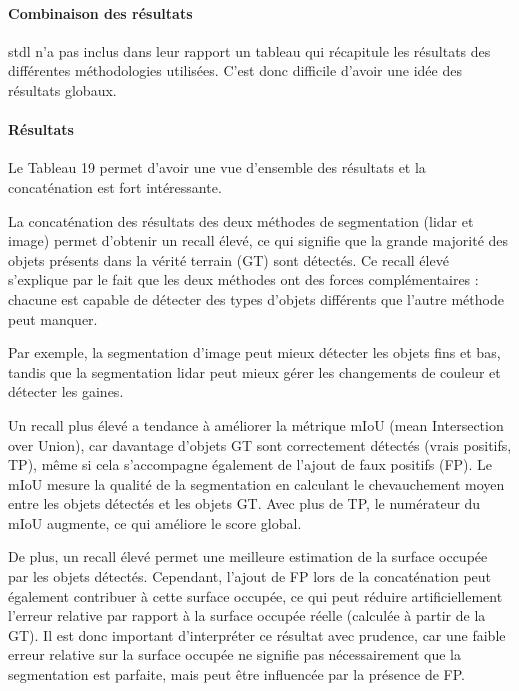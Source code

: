 {{{{\paragraph{Combinaison des résultats}

\acrshort{stdl} n'a pas inclus dans leur rapport un tableau qui récapitule les résultats des différentes méthodologies utilisées. C'est donc difficile d'avoir une idée des résultats globaux.

\paragraph{Résultats}

Le Tableau 19 permet d'avoir une vue d'ensemble des résultats et la concaténation est fort intéressante.

La concaténation des résultats des deux méthodes de segmentation (\gls{lidar} et image) permet d'obtenir un recall élevé, ce qui signifie que la grande majorité des objets présents dans la vérité terrain (GT) sont détectés. Ce recall élevé s'explique par le fait que les deux méthodes ont des forces complémentaires : chacune est capable de détecter des types d'objets différents que l'autre méthode peut manquer.

Par exemple, la segmentation d'image peut mieux détecter les objets fins et bas, tandis que la segmentation \gls{lidar} peut mieux gérer les changements de couleur et détecter les gaines.

Un recall plus élevé a tendance à améliorer la métrique mIoU (mean Intersection over Union), car davantage d'objets GT sont correctement détectés (vrais positifs, TP), même si cela s'accompagne également de l'ajout de faux positifs (FP). Le mIoU mesure la qualité de la segmentation en calculant le chevauchement moyen entre les objets détectés et les objets GT. Avec plus de TP, le numérateur du mIoU augmente, ce qui améliore le score global.

De plus, un recall élevé permet une meilleure estimation de la surface occupée par les objets détectés. Cependant, l'ajout de FP lors de la concaténation peut également contribuer à cette surface occupée, ce qui peut réduire artificiellement l'erreur relative par rapport à la surface occupée réelle (calculée à partir de la GT). Il est donc important d'interpréter ce résultat avec prudence, car une faible erreur relative sur la surface occupée ne signifie pas nécessairement que la segmentation est parfaite, mais peut être influencée par la présence de FP.

}}}}
